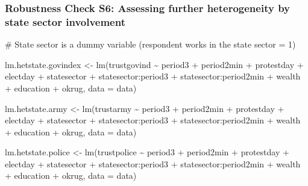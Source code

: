 \documentclass[
  letterpaper,
  DIV=11,
  numbers=noendperiod]{scrartcl}
\newenvironment{Shaded}{\begin{snugshade}}{\end{snugshade}}
\newcommand{\AttributeTok}[1]{\textcolor[rgb]{0.40,0.45,0.13}{#1}}
\newcommand{\CommentTok}[1]{\textcolor[rgb]{0.37,0.37,0.37}{#1}}
\newcommand{\FunctionTok}[1]{\textcolor[rgb]{0.28,0.35,0.67}{#1}}
\newcommand{\NormalTok}[1]{\textcolor[rgb]{0.00,0.23,0.31}{#1}}
\newcommand{\OtherTok}[1]{\textcolor[rgb]{0.00,0.23,0.31}{#1}}
\newcommand{\SpecialCharTok}[1]{\textcolor[rgb]{0.37,0.37,0.37}{#1}}
\begin{document}
\subsubsection{Robustness Check S6: Assessing further heterogeneity by
state sector
involvement}\label{robustness-check-s6-assessing-further-heterogeneity-by-state-sector-involvement}

\begin{Shaded}
\begin{Highlighting}[]
\CommentTok{\# State sector is a dummy variable (respondent works in the state sector = 1)}

\NormalTok{lm.hetstate.govindex }\OtherTok{\textless{}{-}} \FunctionTok{lm}\NormalTok{(trustgovind }\SpecialCharTok{\textasciitilde{}}\NormalTok{ period3 }\SpecialCharTok{+}\NormalTok{ period2min }\SpecialCharTok{+}\NormalTok{ protestday }\SpecialCharTok{+}\NormalTok{ electday }\SpecialCharTok{+}
\NormalTok{                             statesector }\SpecialCharTok{+}\NormalTok{ statesector}\SpecialCharTok{:}\NormalTok{period3 }\SpecialCharTok{+}\NormalTok{ statesector}\SpecialCharTok{:}\NormalTok{period2min }\SpecialCharTok{+}
\NormalTok{                             wealth }\SpecialCharTok{+}\NormalTok{ education }\SpecialCharTok{+}\NormalTok{ okrug, }\AttributeTok{data =}\NormalTok{ data)}

\NormalTok{lm.hetstate.army }\OtherTok{\textless{}{-}} \FunctionTok{lm}\NormalTok{(trustarmy }\SpecialCharTok{\textasciitilde{}}\NormalTok{ period3 }\SpecialCharTok{+}\NormalTok{ period2min }\SpecialCharTok{+}\NormalTok{ protestday }\SpecialCharTok{+}\NormalTok{ electday }\SpecialCharTok{+}
\NormalTok{                         statesector }\SpecialCharTok{+}\NormalTok{ statesector}\SpecialCharTok{:}\NormalTok{period3 }\SpecialCharTok{+}\NormalTok{ statesector}\SpecialCharTok{:}\NormalTok{period2min }\SpecialCharTok{+}
\NormalTok{                         wealth }\SpecialCharTok{+}\NormalTok{ education }\SpecialCharTok{+}\NormalTok{ okrug, }\AttributeTok{data =}\NormalTok{ data)}

\NormalTok{lm.hetstate.police }\OtherTok{\textless{}{-}} \FunctionTok{lm}\NormalTok{(trustpolice }\SpecialCharTok{\textasciitilde{}}\NormalTok{ period3 }\SpecialCharTok{+}\NormalTok{ period2min }\SpecialCharTok{+}\NormalTok{ protestday }\SpecialCharTok{+}\NormalTok{ electday }\SpecialCharTok{+}
\NormalTok{                           statesector }\SpecialCharTok{+}\NormalTok{ statesector}\SpecialCharTok{:}\NormalTok{period3 }\SpecialCharTok{+}\NormalTok{ statesector}\SpecialCharTok{:}\NormalTok{period2min }\SpecialCharTok{+}
\NormalTok{                           wealth }\SpecialCharTok{+}\NormalTok{ education }\SpecialCharTok{+}\NormalTok{ okrug, }\AttributeTok{data =}\NormalTok{ data)}


\end{Highlighting}
\end{Shaded}
\end{document}
